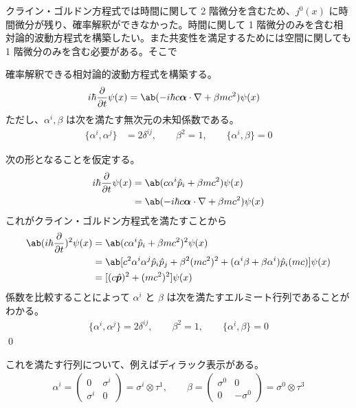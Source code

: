 \documentclass[uplatex,dvipdfmx,a4paper,11pt]{jlreq}
\makeatletter
\newcommand{\pp}{\bm{p}}
\newcommand{\vnabla}{\mathbf{\nabla}}
\numberwithin{equation}{section}
\theoremstyle{definition}
\renewenvironment{proof}[1][\proofname]{\par
  \normalfont
  \topsep6\p@\@plus6\p@ \trivlist
  \item[\hskip\labelsep{\bfseries #1}\@addpunct{\bfseries}]\ignorespaces\quad\par
}{%
  \qed\endtrivlist\@endpefalse
}
\renewcommand\proofname{証明}
\makeatother
\begin{document}
クライン・ゴルドン方程式では時間に関して 2 階微分を含むため、$j^0(x)$ に時間微分が残り、確率解釈ができなかった。時間に関して 1 階微分のみを含む相対論的波動方程式を構築したい。また共変性を満足するためには空間に関しても 1 階微分のみを含む必要がある。そこで
\begin{theorem}[ディラック方程式]
  確率解釈できる相対論的波動方程式を構築する。
  \begin{align}
    i\hbar\diffp{}{t}\psi(x) & = \ab(-i\hbar c\bm{\alpha}\cdot\vnabla + \beta mc^2)\psi(x)
  \end{align}
  ただし、$\alpha^i, \beta$ は次を満たす無次元の未知係数である。
  \begin{align}
    \lbrace\alpha^i,\alpha^j\rbrace & = 2\delta^{ij}, \qquad \beta^2 = 1, \qquad \lbrace\alpha^i,\beta\rbrace = 0 \label{condition}
  \end{align}
\end{theorem}
\begin{proof}
  次の形となることを仮定する。
  \begin{align}
    i\hbar\diffp{}{t}\psi(x) & = \ab(c\alpha^i\hat{p}_i + \beta mc^2)\psi(x)               \\
                             & = \ab(-i\hbar c\bm{\alpha}\cdot\vnabla + \beta mc^2)\psi(x)
  \end{align}
  これがクライン・ゴルドン方程式を満たすことから
  \begin{align}
    \ab(i\hbar\diffp{}{t})^2\psi(x) & = \ab(c\alpha^i\hat{p}_i + \beta mc^2)^2\psi(x)                                                                      \\
                                    & = \ab[c^2\alpha^i\alpha^j\hat{p}_i\hat{p}_j + \beta^2(mc^2)^2 + (\alpha^i\beta + \beta\alpha^i)\hat{p}_i(mc)]\psi(x) \\
                                    & = [(c\hat{\pp})^2 + (mc^2)^2]\psi(x)
  \end{align}
  係数を比較することによって $\alpha^i$ と $\beta$ は次を満たすエルミート行列であることがわかる。
  \begin{align}
    \lbrace\alpha^i,\alpha^j\rbrace = 2\delta^{ij}, \qquad \beta^2 = 1, \qquad \lbrace\alpha^i,\beta\rbrace = 0 \label{condition}
  \end{align}
\end{proof}

これを満たす行列について、例えばディラック表示がある。
\begin{align}
  \alpha^i = \begin{pmatrix}
               0        & \sigma^i \\
               \sigma^i & 0
             \end{pmatrix} = \sigma^i \otimes \tau^1, \qquad
  \beta = \begin{pmatrix}
            \sigma^0 & 0         \\
            0        & -\sigma^0
          \end{pmatrix} = \sigma^0 \otimes \tau^3
\end{align}
\end{document}
